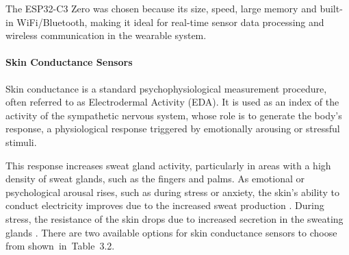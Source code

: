 \documentclass[a4paper,12pt]{report}
\begin{document}
The ESP32-C3 Zero was chosen because its size, speed, large memory and built-in WiFi/Bluetooth, making it ideal for real-time sensor data processing and wireless communication in the wearable system.
\paragraph{Skin Conductance Sensors \\[0.3cm]} 
Skin conductance is a standard psychophysiological measurement procedure, often referred to as Electrodermal Activity (EDA). It is used as an index of the activity of the sympathetic nervous system, whose role is to generate the body's response, a physiological response triggered by emotionally arousing or stressful stimuli. 

This response increases sweat gland activity, particularly in areas with a high density of sweat glands, such as the fingers and palms. As emotional or psychological arousal rises, such as during stress or anxiety, the skin's ability to conduct electricity improves due to the increased sweat production \cite{mcilwain2019_autism_healthcare}. During stress, the resistance of the skin drops due to increased secretion in the sweating glands \cite{lord2016_autism_diagnosis}. There are two available options for skin conductance sensors to choose from shown in Table 3.2.
\clearpage
\renewcommand{\arraystretch}{1.8} %
\end{document}
